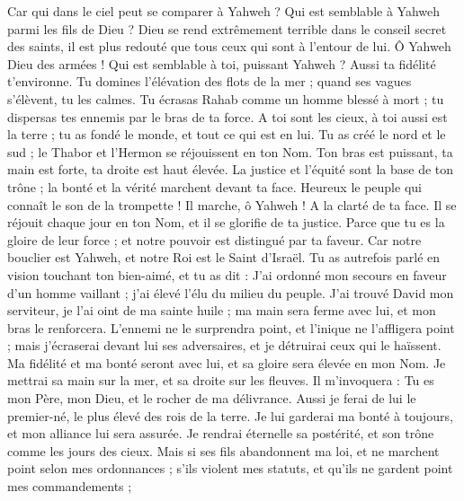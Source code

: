 \begin{multicols}{2}
Car qui dans le ciel peut se comparer à Yahweh ? Qui est semblable à Yahweh parmi les fils de Dieu ?
Dieu se rend extrêmement terrible dans le conseil secret des saints, il est plus redouté que tous ceux qui sont à l'entour de lui.
Ô Yahweh Dieu des armées ! Qui est semblable à toi, puissant Yahweh ? Aussi ta fidélité t'environne.
Tu domines l'élévation des flots de la mer ; quand ses vagues s'élèvent, tu les calmes.
Tu écrasas Rahab comme un homme blessé à mort ; tu dispersas tes ennemis par le bras de ta force.
A toi sont les cieux, à toi aussi est la terre ; tu as fondé le monde, et tout ce qui est en lui.
Tu as créé le nord et le sud ; le Thabor et l'Hermon se réjouissent en ton Nom.
Ton bras est puissant, ta main est forte, ta droite est haut élevée.
La justice et l'équité sont la base de ton trône ; la bonté et la vérité marchent devant ta face.
Heureux le peuple qui connaît le son de la trompette ! Il marche, ô Yahweh ! A la clarté de ta face.
Il se réjouit chaque jour en ton Nom, et il se glorifie de ta justice.
Parce que tu es la gloire de leur force ; et notre pouvoir est distingué par ta faveur.
Car notre bouclier est Yahweh, et notre Roi est le Saint d'Israël.
Tu as autrefois parlé en vision touchant ton bien-aimé, et tu as dit : J'ai ordonné mon secours en faveur d'un homme vaillant ; j'ai élevé l'élu du milieu du peuple.
J'ai trouvé David mon serviteur, je l'ai oint de ma sainte huile ;
ma main sera ferme avec lui, et mon bras le renforcera.
L'ennemi ne le surprendra point, et l'inique ne l'affligera point ;
mais j'écraserai devant lui ses adversaires, et je détruirai ceux qui le haïssent.
Ma fidélité et ma bonté seront avec lui, et sa gloire sera élevée en mon Nom.
Je mettrai sa main sur la mer, et sa droite sur les fleuves.
Il m'invoquera : Tu es mon Père, mon Dieu, et le rocher de ma délivrance.
Aussi je ferai de lui le premier-né, le plus élevé des rois de la terre.
Je lui garderai ma bonté à toujours, et mon alliance lui sera assurée.
Je rendrai éternelle sa postérité, et son trône comme les jours des cieux.
Mais si ses fils abandonnent ma loi, et ne marchent point selon mes ordonnances ;
s'ils violent mes statuts, et qu'ils ne gardent point mes commandements ;

\end{multicols}

